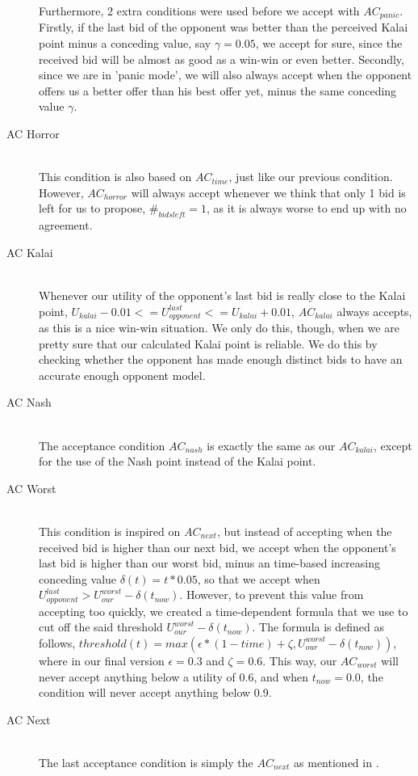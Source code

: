 \begin{description}
Furthermore, 2 extra conditions were used before we accept with $AC_{panic}$. Firstly, if the last bid of the opponent was better than the perceived Kalai point minus a conceding value, say $\gamma = 0.05$, we accept for sure, since the received bid will be almost as good as a win-win or even better. Secondly, since we are in 'panic mode', we will also always accept when the opponent offers us a better offer than his best offer yet, minus the same conceding value $\gamma$.

  \item[AC Horror] \hfill \\
This condition is also based on $AC_{time}$, just like our previous condition. However, $AC_{horror}$ will always accept whenever we think that only 1 bid is left for us to propose, $\#_{bids left} = 1$, as it is always worse to end up with no agreement.

  \item[AC Kalai] \hfill \\
Whenever our utility of the opponent's last bid is really close to the Kalai point, $U_{kalai} - 0.01 <= U_{opponent}^{last} <= U_{kalai} + 0.01$, $AC_{kalai}$ always accepts, as this is a nice win-win situation. We only do this, though, when we are pretty sure that our calculated Kalai point is reliable. We do this by checking whether the opponent has made enough distinct bids to have an accurate enough opponent model.

  \item[AC Nash] \hfill \\
The acceptance condition $AC_{nash}$ is exactly the same as our $AC_{kalai}$, except for the use of the Nash point instead of the Kalai point.

  \item[AC Worst] \hfill \\
This condition is inspired on $AC_{next}$\cite{baarslag2013acceptance}, but instead of accepting when the received bid is higher than our next bid, we accept when the opponent's last bid is higher than our worst bid, minus an time-based increasing conceding value $\delta(t) = t * 0.05$, so that we accept when $U_{opponent}^{last} > U_{our}^{worst} - \delta(t_{now})$. However, to prevent this value from accepting too quickly, we created a time-dependent formula that we use to cut off the said threshold $U_{our}^{worst} - \delta(t_{now})$. The formula is defined as follows, $threshold(t) = max(\epsilon * (1-time) + \zeta, U_{our}^{worst} - \delta(t_{now}))$, where in our final version $\epsilon = 0.3$ and $\zeta = 0.6$. This way, our $AC_{worst}$ will never accept anything below a utility of 0.6, and when $t_{now} = 0.0$, the condition will never accept anything below 0.9.

  \item[AC Next] \hfill \\
The last acceptance condition is simply the $AC_{next}$ as mentioned in \cite{baarslag2013acceptance}.

\end{description}

